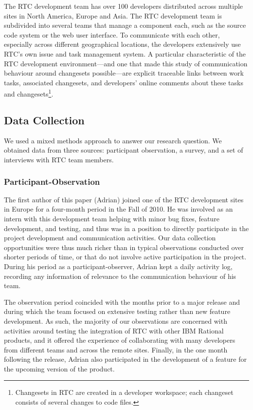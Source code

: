 \documentclass[12pt,oneside]{book}
\begin{document}
The RTC development team has over 100 developers distributed across multiple sites in North America, Europe and Asia.  The RTC development team is subdivided into several teams that manage a component each, such as the source code system or the web user interface. To communicate with each other, especially across different geographical locations, the developers extensively use RTC's own issue and task management system. A particular characteristic of the RTC development environment---and one that made this study of communication behaviour around changesets possible---are explicit traceable links between work tasks, associated changesets, and developers' online comments about these tasks and changesets\footnote{Changesets in RTC are created in a developer workspace; each changeset consists of several changes to code files.}.

\subsection{Data Collection}

We used a mixed methods approach to answer our research question. We obtained data from three sources: participant observation, a survey, and a set of interviews with RTC team members.

\subsubsection{Participant-Observation}

The first author of this paper (Adrian) joined one of the RTC development sites in Europe for a four-month period in the Fall of 2010. He was involved as an intern with this development team helping with minor bug fixes, feature development, and testing, and thus was in a position to directly participate in the project development and communication activities. Our data collection opportunities were thus much richer than in typical observations conducted over shorter periods of time, or that do not involve active participation in the project.  During his period as a participant-observer, Adrian kept a daily activity log, recording any information of relevance to the communication behaviour of his team.

The observation period coincided with the months prior to a major release and during which the team focused on extensive testing rather than new feature development. As such, the majority of our observations are concerned with activities around testing the integration of RTC with other IBM Rational products, and it offered the experience of collaborating with many developers from different teams and across the remote sites. Finally, in the one month following the release, Adrian also participated in the development of a feature for the upcoming version of the product.
\end{document}
